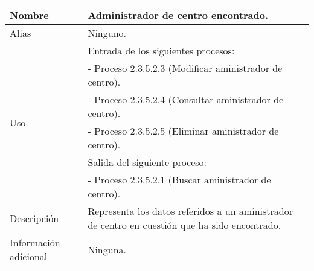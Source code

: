 \begin{center}
  \begin{tabular}{| l | p{9cm} |}
    \hline
    Nombre & \textbf{Administrador de centro encontrado}.\\
    \hline
    Alias & Ninguno.\\
    \hline
    \multirow{6}{*}{Uso} & Entrada de los siguientes procesos:\\
                         & - Proceso 2.3.5.2.3 (Modificar aministrador de centro).\\
                         & - Proceso 2.3.5.2.4 (Consultar aministrador de centro).\\
                         & - Proceso 2.3.5.2.5 (Eliminar aministrador de centro).\\
                         & Salida del siguiente proceso:\\
                         & - Proceso 2.3.5.2.1 (Buscar aministrador de centro).\\
    \hline
    Descripción & Representa los datos referidos a un aministrador de centro
                  en cuestión que ha sido encontrado.\\
    \hline
    Información adicional & Ninguna.\\
    \hline
  \end{tabular}
\end{center}
